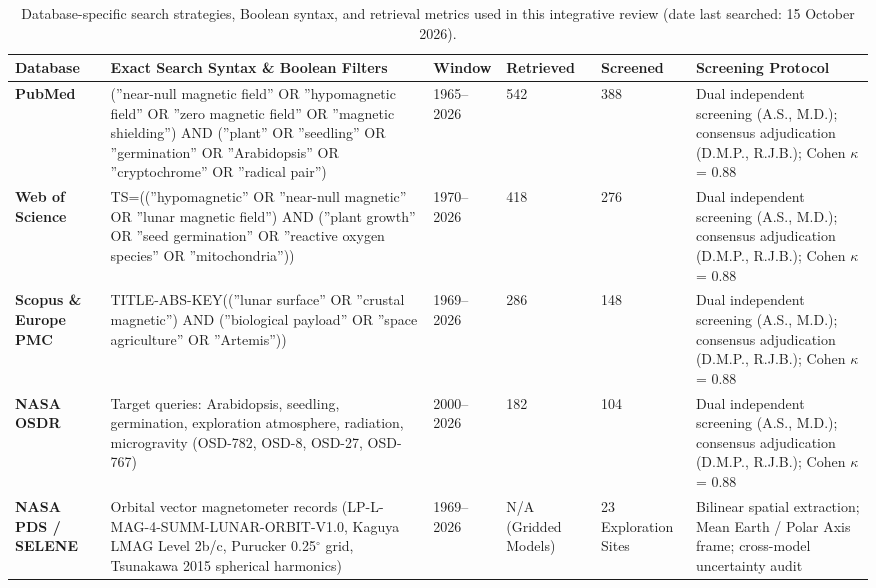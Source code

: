 \begin{table}[t]
\caption{Database-specific search strategies, Boolean syntax, and retrieval metrics used in this integrative review (date last searched: 15 October 2026).}\label{tab:search}
\begin{tabular*}{\textwidth}{@{\extracolsep\fill}p{2.0cm}p{7.0cm}p{1.6cm}p{1.3cm}p{1.3cm}p{3.0cm}@{}}
\toprule
Database & Exact Search Syntax \& Boolean Filters & Window & Retrieved & Screened & Screening Protocol \\
\midrule
\raggedright\scriptsize \textbf{PubMed} & \raggedright\scriptsize (''near-null magnetic field'' OR ''hypomagnetic field'' OR ''zero magnetic field'' OR ''magnetic shielding'') AND (''plant'' OR ''seedling'' OR ''germination'' OR ''Arabidopsis'' OR ''cryptochrome'' OR ''radical pair'') & \raggedright\scriptsize 1965--2026 & \raggedright\scriptsize 542 & \raggedright\scriptsize 388 & \raggedright\scriptsize Dual independent screening (A.S., M.D.); consensus adjudication (D.M.P., R.J.B.); Cohen $\kappa$ = 0.88 \\
\raggedright\scriptsize \textbf{Web of Science} & \raggedright\scriptsize TS=((''hypomagnetic'' OR ''near-null magnetic'' OR ''lunar magnetic field'') AND (''plant growth'' OR ''seed germination'' OR ''reactive oxygen species'' OR ''mitochondria'')) & \raggedright\scriptsize 1970--2026 & \raggedright\scriptsize 418 & \raggedright\scriptsize 276 & \raggedright\scriptsize Dual independent screening (A.S., M.D.); consensus adjudication (D.M.P., R.J.B.); Cohen $\kappa$ = 0.88 \\
\raggedright\scriptsize \textbf{Scopus \& Europe PMC} & \raggedright\scriptsize TITLE-ABS-KEY((''lunar surface'' OR ''crustal magnetic'') AND (''biological payload'' OR ''space agriculture'' OR ''Artemis'')) & \raggedright\scriptsize 1969--2026 & \raggedright\scriptsize 286 & \raggedright\scriptsize 148 & \raggedright\scriptsize Dual independent screening (A.S., M.D.); consensus adjudication (D.M.P., R.J.B.); Cohen $\kappa$ = 0.88 \\
\raggedright\scriptsize \textbf{NASA OSDR} & \raggedright\scriptsize Target queries: Arabidopsis, seedling, germination, exploration atmosphere, radiation, microgravity (OSD-782, OSD-8, OSD-27, OSD-767) & \raggedright\scriptsize 2000--2026 & \raggedright\scriptsize 182 & \raggedright\scriptsize 104 & \raggedright\scriptsize Dual independent screening (A.S., M.D.); consensus adjudication (D.M.P., R.J.B.); Cohen $\kappa$ = 0.88 \\
\raggedright\scriptsize \textbf{NASA PDS / SELENE} & \raggedright\scriptsize Orbital vector magnetometer records (LP-L-MAG-4-SUMM-LUNAR-ORBIT-V1.0, Kaguya LMAG Level 2b/c, Purucker 0.25$^\circ$ grid, Tsunakawa 2015 spherical harmonics) & \raggedright\scriptsize 1969--2026 & \raggedright\scriptsize N/A (Gridded Models) & \raggedright\scriptsize 23 Exploration Sites & \raggedright\scriptsize Bilinear spatial extraction; Mean Earth / Polar Axis frame; cross-model uncertainty audit \\

\end{tabular*}
\end{table}
